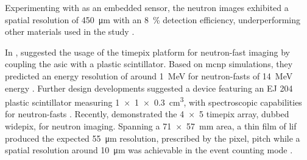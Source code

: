 \documentclass[../../../main.tex]{subfiles}%
\begin{document}
    Experimenting with  as an embedded sensor, the neutron images exhibited a spatial resolution of \SI{450}{\micro\meter} with an \SI{8}{\percent} detection efficiency, underperforming other materials used in the study \cite{Jakubek_2007}.
    \par%
    In \citeyear*{Uher_2009}, \citeauthor*{Uher_2009} suggested the usage of the \gls{timepix} platform for \gls{neutron-fast} imaging by coupling the \gls{asic} with a plastic scintillator.
    Based on \gls{mcnp} simulations, they predicted an energy resolution of around \SI{1}{\mega\electronvolt} for \glspl{neutron-fast} of \SI{14}{\mega\electronvolt} energy \cite{Uher_2009}.
    Further design developments suggested a device featuring an EJ 204 plastic scintillator measuring \SI{1 x 1 x 0.3}{\centi\meter\cubed}, with spectroscopic capabilities for \glspl{neutron-fast} \cite{Uher_2011}.
    Recently, \citeauthor*{Krejci_2016} demonstrated the \num{4x5} \gls{timepix} array, dubbed \gls{widepix}, for neutron imaging.
    Spanning a \SI{71 x 57}{\milli\meter} area, a thin film of \gls{lif} produced the expected \SI{55}{\micro\meter} resolution, prescribed by the pixel, pitch while a spatial resolution around \SI{10}{\micro\meter} was achievable in the event counting mode \cite{Krejci_2016}.
\end{document}
